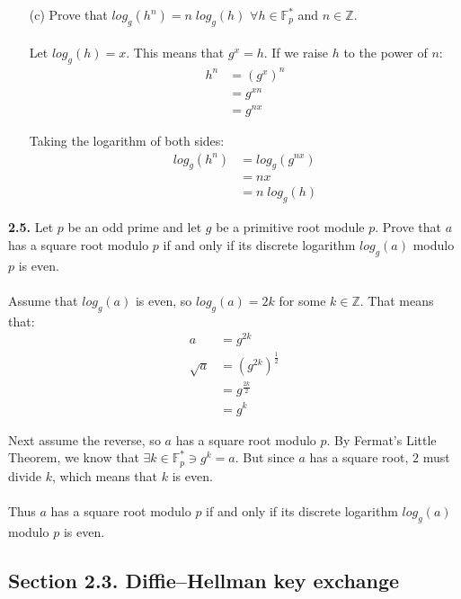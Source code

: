 \documentclass[11pt,fleqn]{article}
\newcommand{\Z}{\mathbb{Z}}
\newcommand{\F}{\mathbb{F}}
\begin{document}
\begin{itemize}
\item[(c)] Prove that $log_g (h^n) = n \; log_g (h)$ $\forall h \in \F_p^*$ and $n \in \Z$.\\
\\
  Let $log_g (h) = x$.  This means that $g^{x} = h$.  If we raise $h$ to the power of $n$:
\begin{align}
  h^n &= (g^{x})^n\nonumber\\
          &= g^{xn}\nonumber\\
          &= g^{nx}\nonumber
\end{align}

Taking the logarithm of both sides:
\begin{align}
  log_g (h^n) &= log_g (g^{nx})\nonumber\\
  &= nx\nonumber\\
  &= n\;log_g (h)\nonumber
\end{align}
  
\end{itemize}


\textbf{2.5.} Let $p$ be an odd prime and let $g$ be a primitive root module $p$.  Prove that $a$ has a square root modulo $p$ if and only if its discrete logarithm $log_g (a)$ modulo $p$ is even.\\
\\
Assume that $log_g (a)$ is even, so $log_g (a) = 2k$ for some $k \in \Z$.  That means that:
\begin{align}
  a &= g^{2k}\nonumber\\
  \sqrt{a} &= (g^{2k})^{\frac{1}{2}}\nonumber\\
  &= g^{\frac{2k}{2}}\nonumber\\
  &= g^k\nonumber
\end{align}

Next assume the reverse, so $a$ has a square root modulo $p$.  By Fermat's Little Theorem, we know that $\exists k \in \F_p^* \ni g^k = a$.  But since $a$ has a square root, $2$ must divide $k$, which means that $k$ is even.\\
\\
Thus $a$ has a square root modulo $p$ if and only if its discrete logarithm $log_g (a)$ modulo $p$ is even.

\subsection*{Section 2.3. Diffie–Hellman key exchange}
\end{document}
